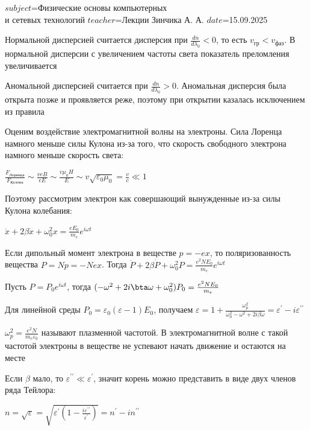 $subject$=Физические основы компьютерных \\ и сетевых технологий
$teacher$=Лекции Зинчика А. А.
$date$=15.09.2025

Нормальной дисперсией считается дисперсия при $\frac{dn}{d\lambda_0} < 0$, то есть $v_{\text{гр}} < v_{\text{фаз}}$. В нормальной дисперсии с увеличением частоты света показатель преломления увеличивается

Аномальной дисперсией считается при $\frac{dn}{d\lambda_0} > 0$. Аномальная дисперсия была открыта позже и проявляется реже, поэтому при открытии казалась исключением из правила

\mediumvspace

Оценим воздействие электромагнитной волны на электроны. Сила Лоренца намного меньше силы Кулона из-за того, что скорость свободного электрона намного меньше скорость света:

$\frac{F_{\text{Лоренца}}}{F_{\text{Кулона}}} \sim \frac{v e B}{e E} \sim \frac{v \mu_0 H}{E} \sim v \sqrt{\varepsilon_0 \mu_0} = \frac{v}{c} \ll 1$

Поэтому рассмотрим электрон как совершающий вынужденные из-за силы Кулона колебания:

$\ddot x + 2 \beta \dot x + \omega_0^2 x = \frac{e E_0}{m_e} e^{i \omega t}$

Если дипольный момент электрона в веществе $p = -ex$, то поляризованность вещества $P = Np = -Nex$. Тогда $\ddot P + 2 \beta \dot P + \omega^2_0 P = \frac{e^2 N E_0}{m_e} e^{i \omega t}$

Пусть $P = P_0 e^{i \omega t}$, тогда $(-\omega^2 + 2 i \bta \omega + \omega_0^2) P_0 = \frac{e^2 N E_0}{m_e}$

Для линейной среды $P_0 = \varepsilon_0 (\varepsilon - 1) E_0$, получаем $\varepsilon = 1 + \frac{\omega_p^2}{\omega_0^2 - \omega^2 + 2i\beta \omega} = \varepsilon^{\prime} - i \varepsilon^{\prime\prime}$

$\omega_p^2 = \frac{e^2 N}{m_e \varepsilon_0}$ называют плазменной частотой. В электромагнитной волне с такой частотой электроны в веществе не успевают начать движение и остаются на месте

Если $\beta$ мало, то $\varepsilon^{\prime\prime} \ll \varepsilon^{\prime}$, значит корень можно представить в виде двух членов ряда Тейлора:

$n = \sqrt{\varepsilon} = \sqrt{\varepsilon^{\prime} \left(1 - \frac{i \varepsilon^{\prime\prime}}{\varepsilon^{\prime}}\right)} = n^{\prime} - i n^{\prime\prime}$

